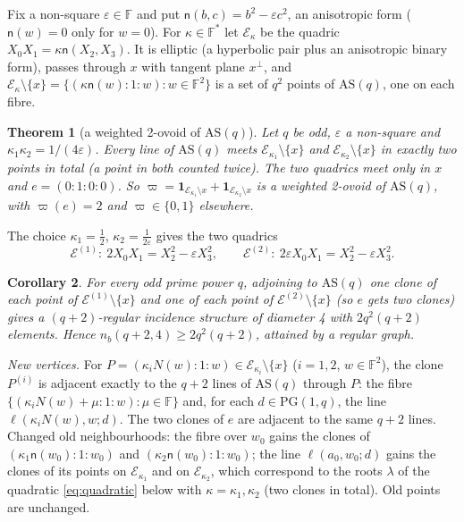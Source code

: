 \documentclass[11pt]{amsart}
\newtheorem{theorem}{Theorem}[section]
\newtheorem{corollary}[theorem]{Corollary}
\theoremstyle{definition}
\theoremstyle{remark}
\numberwithin{equation}{section}
\newcommand{\F}{\mathbb F}
\newcommand{\PG}{\mathrm{PG}}
\newcommand{\AS}{\mathrm{AS}}
\newcommand{\nb}{n_b}
\newcommand{\cE}{\mathcal E}
\newcommand{\eps}{\varepsilon}
\begin{document}
Fix a non-square $\eps\in\F$ and put $\mathsf n(b,c)=b^2-\eps c^2$, an anisotropic form ($\mathsf n(w)=0$ only for $w=0$). For
$\kappa\in\F^*$ let $\cE_\kappa$ be the quadric $X_0X_1=\kappa \mathsf n(X_2,X_3)$. It is elliptic (a hyperbolic pair plus an
anisotropic binary form), passes through $x$ with tangent plane $x^\perp$, and
$\cE_\kappa\setminus\{x\}=\{(\kappa \mathsf n(w):1:w):w\in\F^2\}$ is a set of $q^2$ points of $\AS(q)$, one on each fibre.

\begin{theorem}[a weighted 2-ovoid of $\AS(q)$]\label{thm:A}
Let $q$ be odd, $\eps$ a non-square and $\kappa_1\kappa_2=1/(4\eps)$. Every line of $\AS(q)$ meets
$\cE_{\kappa_1}\setminus\{x\}$ and $\cE_{\kappa_2}\setminus\{x\}$ in exactly two points in total (a point in both counted
twice). The two quadrics meet only in $x$ and $e=(0:1:0:0)$. So
$\varpi=\mathbf 1_{\cE_{\kappa_1}\setminus x}+\mathbf 1_{\cE_{\kappa_2}\setminus x}$ is a weighted 2-ovoid of $\AS(q)$, with
$\varpi(e)=2$ and $\varpi\in\{0,1\}$ elsewhere.
\end{theorem}

The choice $\kappa_1=\frac12$, $\kappa_2=\frac1{2\eps}$ gives the two quadrics
\[
\cE^{(1)}:\ 2X_0X_1=X_2^2-\eps X_3^2,\qquad \cE^{(2)}:\ 2\eps X_0X_1=X_2^2-\eps X_3^2 .
\]

\begin{corollary}\label{cor:A1}
For every odd prime power $q$, adjoining to $\AS(q)$ one clone of each point of $\cE^{(1)}\setminus\{x\}$ and one of each
point of $\cE^{(2)}\setminus\{x\}$ (so $e$ gets two clones) gives a $(q+2)$-regular incidence structure of diameter 4 with
$2q^2(q+2)$ elements. Hence $\nb(q+2,4)\ge2q^2(q+2)$, attained by a regular graph.
\end{corollary}

\emph{New vertices.} For $P=(\kappa_iN(w):1:w)\in\cE_{\kappa_i}\setminus\{x\}$ ($i=1,2$, $w\in\F^2$), the clone $P^{(i)}$ is
adjacent exactly to the $q+2$ lines of $\AS(q)$ through $P$: the fibre $\{(\kappa_iN(w)+\mu:1:w):\mu\in\F\}$ and, for each
$d\in\PG(1,q)$, the line $\ell(\kappa_iN(w),w;d)$. The two clones of $e$ are adjacent to the same $q+2$ lines. Changed old
neighbourhoods: the fibre over $w_0$ gains the clones of $(\kappa_1\mathsf n(w_0):1:w_0)$ and $(\kappa_2\mathsf n(w_0):1:w_0)$; the line
$\ell(a_0,w_0;d)$ gains the clones of its points on $\cE_{\kappa_1}$ and on $\cE_{\kappa_2}$, which correspond to the roots
$\lambda$ of the quadratic \eqref{eq:quadratic} below with $\kappa=\kappa_1,\kappa_2$ (two clones in total). Old points
are unchanged.
\end{document}
